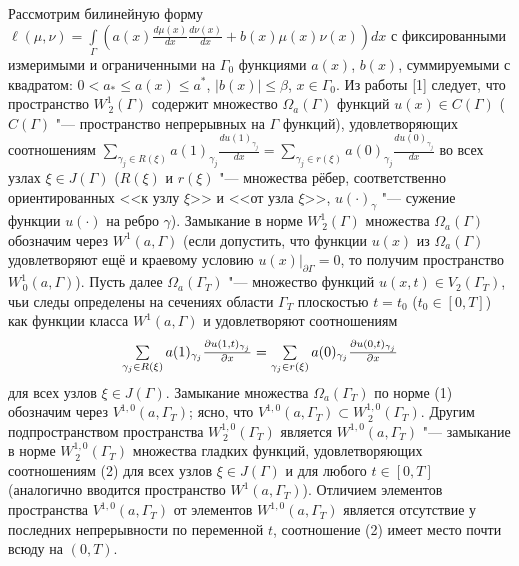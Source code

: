 Рассмотрим билинейную форму
$\ell(\mu,\nu)=\int\limits_{\Gamma}\left(a(x)\frac{d \mu(x)}{d x}\frac{d \nu(x)}{d x}+b(x)\mu(x)\nu(x)\right)dx$ с  фиксированными измеримыми и ограниченными на $\Gamma_0$ функциями $a(x)$, $b(x)$, суммируемыми с квадратом: $0<a_\ast\leqslant a(x)\leqslant a^\ast$, $|b(x)|\leqslant \beta$, $x\in \Gamma_0$. Из работы  [1] следует, что пространство $W^1_{\,2}(\Gamma)$ содержит множество $\Omega_a(\Gamma)$ функций $u(x)\in C(\Gamma)$ ($C(\Gamma)$ "--- пространство непрерывных на $\Gamma$ функций), удовлетворяющих соотношениям
$\sum\limits_{\gamma_j\in R(\xi)}a(1)_{\gamma_j}\frac{du (1)_{\gamma_j}}{dx}
 =\sum\limits_{\gamma_j\in r(\xi)}a(0)_{\gamma_j}\frac{du (0)_{\gamma_j}}{dx}$
во всех узлах $\xi\in J(\Gamma)$ ($R(\xi)$ и $r(\xi)$ "--- множества рёбер, соответственно ориентированных <<к узлу $\xi$>> и <<от узла $\xi$>>, $u(\cdot)_\gamma$ "--- сужение функции $u(\cdot)$ на ребро $\gamma$). Замыкание в норме $W^1_{\,2}(\Gamma)$ множества $\Omega_a(\Gamma)$  обозначим через $W^1(a,\Gamma)$ (если допустить, что функции $u(x)$ из $\Omega_a(\Gamma)$ удовлетворяют ещё и краевому условию $u(x)|_{\partial\Gamma}=0$, то получим пространство $W^1_{\,0}(a,\Gamma)$).  Пусть далее $\Omega_a(\Gamma_{T})$ "--- множество функций $u(x,t)\in V_{2}(\Gamma_{T})$, чьи следы определены на сечениях области $\Gamma_{T}$ плоскостью $t=t_0$ ($t_0\in [0,T]$) как функции класса $W^1(a,\Gamma)$ и удовлетворяют соотношениям
\begin{equation}\label{eq3}
{{\begin{array}{*{20}c}
\sum\limits_{\gamma_{j}\in R(\xi)}a(1)_{\gamma_{j}}\frac{\partial u(1,t)_{\gamma_{j}}}{\partial x}
=\sum\limits_{\gamma_{j}\in r(\xi)}a(0)_{\gamma_{j}}\frac{\partial u(0,t)_{\gamma_{j}}}{\partial x}
\end{array} }}
\end{equation}
для всех узлов $\xi\in J(\Gamma)$. Замыкание множества $\Omega_a(\Gamma_{T})$ по норме (1)  обозначим через $V^{1,0}(a,\Gamma_{T})$; ясно, что  $V^{1,0}(a,\Gamma_{T})\subset W_{\,2}^{1,0}(\Gamma_{T})$. Другим подпространством  пространства $ W_{\,2}^{1,0}(\Gamma_{T})$  является $W^{1,0}(a,\Gamma_{T})$ "--- замыкание в норме $W_{\,2}^{1,0}(\Gamma_{T})$ множества гладких функций, удовлетворяющих соотношениям (2) для всех узлов $\xi\in J(\Gamma)$ и для любого $t\in [0,T]$ (аналогично вводится пространство $W^{1}(a,\Gamma_{T})$). Отличием элементов пространства $V^{1,0}(a,\Gamma_{T})$ от элементов $W^{1,0}(a,\Gamma_{T})$ является отсутствие у последних непрерывности по переменной $t$, соотношение (2) имеет место почти всюду на $(0,T)$.


